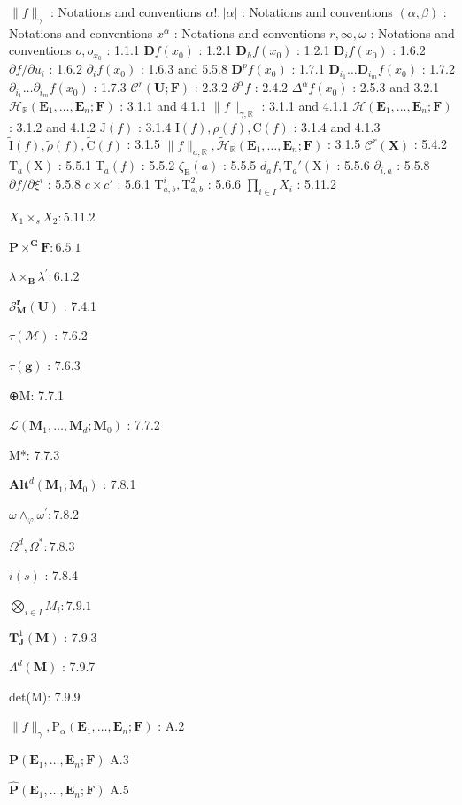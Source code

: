 
\(\| f \|_{\gamma}\) : Notations and conventions \(\alpha!, |\alpha|\) : Notations and conventions \((\alpha, \beta)\) : Notations and conventions \(x^{\alpha}\) : Notations and conventions \(r, \infty, \omega\) : Notations and conventions \(o, o_{x_0}\) : 1.1.1 \(\mathbf{D}f(x_0)\) : 1.2.1 \(\mathbf{D}_h f(x_0)\) : 1.2.1 \(\mathbf{D}_i f(x_0)\) : 1.6.2 \(\partial f / \partial u_i\) : 1.6.2 \(\partial_i f(x_0)\) : 1.6.3 and 5.5.8 \(\mathbf{D}^p f(x_0)\) : 1.7.1 \(\mathbf{D}_{i_1} \ldots \mathbf{D}_{i_m} f(x_0)\) : 1.7.2 \(\partial_{i_1} \ldots \partial_{i_m} f(x_0)\) : 1.7.3 \(\mathcal{C}^r (\mathbf{U};\mathbf{F})\) : 2.3.2 \(\partial^\alpha f\) : 2.4.2 \(\Delta^\alpha f(x_0)\) : 2.5.3 and 3.2.1 \(\mathcal{H}_{\mathbb{R}}(\mathbf{E}_1,\dots,\mathbf{E}_n;\mathbf{F})\) : 3.1.1 and 4.1.1 \(\| f \|_{\gamma,\mathbb{R}}\) : 3.1.1 and 4.1.1 \(\mathcal{H}(\mathbf{E}_1,\dots,\mathbf{E}_n;\mathbf{F})\) : 3.1.2 and 4.1.2 \(\mathrm{J}(f)\) : 3.1.4 \(\mathrm{I}(f), \rho(f), \mathrm{C}(f)\) : 3.1.4 and 4.1.3 \(\tilde{\mathrm{I}}(f), \tilde{\rho}(f), \tilde{\mathrm{C}}(f)\) : 3.1.5 \(\| f \|_{a,\mathbb{R}}, \tilde{\mathcal{H}}_{\mathbb{R}}(\mathbf{E}_1,\dots,\mathbf{E}_n;\mathbf{F})\) : 3.1.5 \(\mathcal{C}^r (\mathbf{X})\) : 5.4.2 \(\mathrm{T}_a(\mathrm{X})\) : 5.5.1 \(\mathrm{T}_a(f)\) : 5.5.2 \(\zeta_{\mathrm{E}}(a)\) : 5.5.5 \(d_a f, \mathrm{T}_a'(\mathrm{X})\) : 5.5.6 \(\partial_{i,a}\) : 5.5.8 \(\partial f / \partial\xi^i\) : 5.5.8 \(c \times c'\) : 5.6.1 \(\mathrm{T}_{a,b}^i, \mathrm{T}_{a,b}^2\) : 5.6.6 \(\prod_{i \in I} X_i\) : 5.11.2

\(X_{1} \times_{s} X_{2}: 5.11.2\)

\(\mathbf{P} \times^{\mathbf{G}} \mathbf{F}: 6.5.1\)

\(\lambda \times_{\mathbf{B}}\lambda^{\prime}:6.1.2\)

\(\mathcal{S}_{\mathbf{M}}^{\boldsymbol{r}}(\mathbf{U})\) : 7.4.1

\(\tau (\mathcal{M})\) : 7.6.2

\(\tau (\mathbf{g})\) : 7.6.3

⊕M: 7.7.1

\(\mathcal{L}(\mathbf{M}_1,\dots ,\mathbf{M}_d;\mathbf{M}_0)\) : 7.7.2

M*: 7.7.3

\(\mathbf{Alt}^d (\mathbf{M}_1;\mathbf{M}_0)\) : 7.8.1

\(\omega \wedge_{\varphi}\omega^{\prime}:7.8.2\)

\(\Omega^d,\Omega^* :7.8.3\)

\(i(s)\) : 7.8.4

\(\bigotimes_{i \in I} M_i: 7.9.1\)

\(\mathbf{T}_{\mathbf{J}}^{1}(\mathbf{M})\) : 7.9.3

\(\Lambda^{d}(\mathbf{M})\) : 7.9.7

det(M): 7.9.9

\(\| f\|_{\gamma},\mathrm{P}_{\alpha}(\mathbf{E}_1,\dots ,\mathbf{E}_n;\mathbf{F})\) : A.2

\(\mathbf{P}(\mathbf{E}_1,\dots ,\mathbf{E}_n;\mathbf{F})\) A.3

\(\hat{\mathbf{P}} (\mathbf{E}_1,\dots ,\mathbf{E}_n;\mathbf{F})\) A.5

